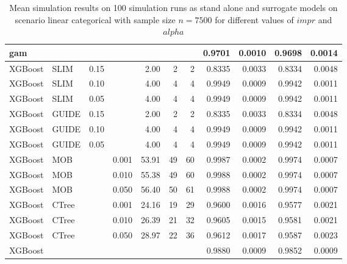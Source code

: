 \begin{table}[!htb]
\begin{tabular}[t]{l|l|r|r|r|r|r|r|r|r|r}
\hline
gam & & & & & & & 0.9701 & 0.0010 & 0.9698 & 0.0014\\
\hline

XGBoost & SLIM & 0.15 & & 2.00 & 2 & 2 & 0.8335 & 0.0033 & 0.8334 & 0.0048\\
XGBoost & SLIM & 0.10 & & 4.00 & 4 & 4 & 0.9949 & 0.0009 & 0.9942 & 0.0011\\
XGBoost & SLIM & 0.05 & & 4.00 & 4 & 4 & 0.9949 & 0.0009 & 0.9942 & 0.0011\\
XGBoost & GUIDE & 0.15 & & 2.00 & 2 & 2 & 0.8335 & 0.0033 & 0.8334 & 0.0048\\
XGBoost & GUIDE & 0.10 & & 4.00 & 4 & 4 & 0.9949 & 0.0009 & 0.9942 & 0.0011\\
XGBoost & GUIDE & 0.05 & & 4.00 & 4 & 4 & 0.9949 & 0.0009 & 0.9942 & 0.0011\\
XGBoost & MOB & & 0.001 & 53.91 & 49 & 60 & 0.9987 & 0.0002 & 0.9974 & 0.0007\\
XGBoost & MOB & & 0.010 & 55.38 & 49 & 60 & 0.9988 & 0.0002 & 0.9974 & 0.0007\\
XGBoost & MOB & & 0.050 & 56.40 & 50 & 61 & 0.9988 & 0.0002 & 0.9974 & 0.0007\\
XGBoost & CTree & & 0.001 & 24.16 & 19 & 29 & 0.9600 & 0.0016 & 0.9577 & 0.0021\\
XGBoost & CTree &  & 0.010 & 26.39 & 21 & 32 & 0.9605 & 0.0015 & 0.9581 & 0.0021\\
XGBoost & CTree & & 0.050 & 28.97 & 22 & 36 & 0.9612 & 0.0017 & 0.9587 & 0.0023\\
\hline
XGBoost & & & & & & & 0.9880 & 0.0009 & 0.9852 & 0.0009\\
\hline

\end{tabular}
\caption{Mean simulation results on 100 simulation runs as stand alone and surrogate models on scenario linear categorical with sample size $n = 7500$ for different values of $impr$ and $alpha$}
\label{tab:app_linear_abrupt_5000}

\end{table}




